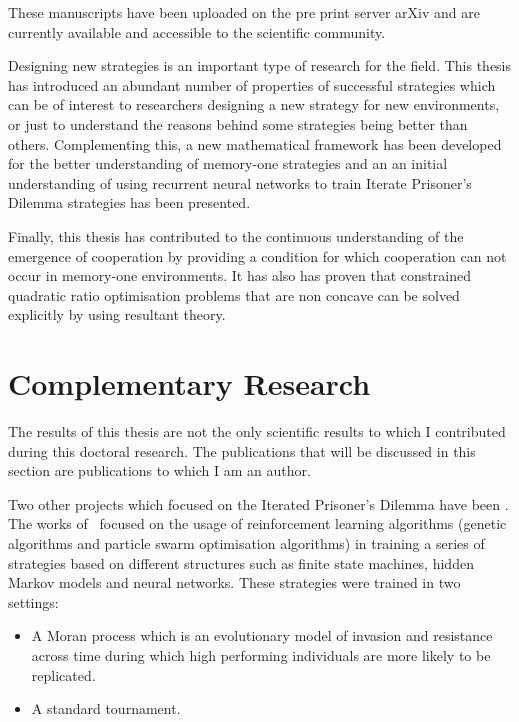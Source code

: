These manuscripts have been uploaded on the pre
print server arXiv and are currently available and accessible to the scientific
community.

Designing new strategies is an important type of research for the field.
This thesis has introduced an abundant number of properties of successful
strategies which can be of interest to researchers designing a new strategy
for new environments, or just to understand the reasons behind some strategies
being better than others. Complementing this, a new mathematical framework has
been developed for the better understanding of memory-one strategies and an
an initial understanding of using recurrent neural networks to train Iterate Prisoner's
Dilemma strategies has been presented.

Finally, this thesis has contributed to the continuous understanding of the emergence of
cooperation by providing a condition for which cooperation can not occur in
memory-one environments. It has also has proven that constrained quadratic
ratio optimisation problems that are non concave can be solved explicitly by
using resultant theory.


\section{Complementary Research}

The results of this thesis are not the only scientific results to which I
contributed during this doctoral research. The publications that will be
discussed in this section are publications to which I am an author.

Two other projects which focused on the Iterated
Prisoner's Dilemma have been
\cite{Knight2017, Harper2017}. The works of~\cite{Knight2017, Harper2017}
focused on the usage of reinforcement learning algorithms (genetic algorithms
and particle swarm optimisation algorithms) in training a series of strategies
based on different structures such as finite state machines, hidden Markov
models and neural networks. These strategies were trained in two settings:

\begin{itemize}
    \item A Moran process which is an evolutionary model of invasion and
    resistance across time during which high performing individuals are more
    likely to be replicated.
    \item A standard tournament.
\end{itemize}

